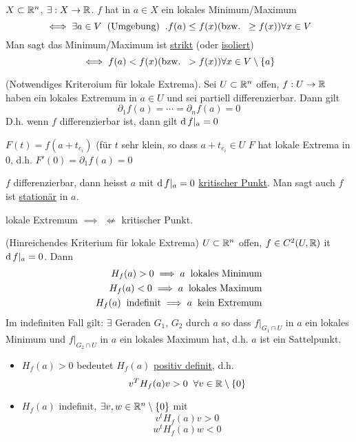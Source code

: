 \begin{Def}
  $X\subset \mathbb{R}^n$, $\exists:X\rightarrow \mathbb{R}$. $f$ hat in $a\in X$ ein lokales Minimum/Maximum 
  \[\iff\exists a\in V\hspace{2mm}\text{(Umgebung)}\hspace{2mm}. f(a)\leq f(x) (\text{bzw.}\hspace{2mm} \geq f(x)) \forall x\in V\]
  Man sagt das Minimum/Maximum ist \ul{strikt} (oder \ul{isoliert})
  \[\iff f(a)<f(x)(\text{bzw.}\hspace{2mm}>f(x))\forall x\in V\setminus \left\{ a \right\}\]
\end{Def}
\begin{Sat}
  (Notwendiges Kriteroium für lokale Extrema). Sei $U\subset\mathbb{R}^n$ offen, $f:U\rightarrow\mathbb{R}$ haben ein lokales Extremum in $a\in U$ und sei partiell differenzierbar. Dann gilt
  \[\partial_1f(a)=\cdots=\partial_nf(a)=0\]
  D.h. wenn $f$ differenzierbar ist, dann gilt $\operatorname{d} f|_a=0$
\end{Sat}
\begin{Bew}
  $F(t)=f(a+t_{e_i})$ (für $t$ sehr klein, so dass $a+t_{e_i}\in U$ $F$ hat lokale Extrema in 0, d.h. $F'(0)=\partial_1 f(a)=0$
\end{Bew}
\begin{Def}
  $f$ differenzierbar, dann heisst $a$ mit $\operatorname{d} f|_a=0$ \ul{kritischer Punkt}. Man sagt auch $f$ ist \ul{stationär} in $a$. 
\end{Def}
\begin{Bem}
  lokale Extremum $\implies$ $\not\Leftarrow$ kritischer Punkt.
\end{Bem}
\begin{Sat}
  (Hinreichendes Kriterium für lokale Extrema) $U\subset\mathbb{R}^n$ offen, $f\in C^2(U,\mathbb{R})$ it $\operatorname{d} f|_a=0$. Dann
  \begin{eqnarray*}
    H_f(a)>0\implies a\hspace{2mm}\text{lokales Minimum}\\
    H_f(a)<0\implies a\hspace{2mm}\text{lokales Maximum}\\
    H_f(a)\hspace{2mm}\text{indefinit}\implies a\hspace{2mm}\text{kein Extremum}
  \end{eqnarray*}
  Im indefiniten Fall gilt: $\exists$ Geraden $G_1$, $G_2$ durch $a$ so dass $f|_{G_1\cap U}$ in $a$ ein lokales Minimum und $f|_{G_2\cap U}$ in $a$ ein lokales Maximum hat, d.h. $a$ ist ein Sattelpunkt.
\end{Sat}
\begin{Bem}
  \begin{itemize}
    \item 
      $H_f(a)>0$ bedeutet $H_f(a)$ \ul{positiv definit}, d.h. 
      \[v^TH_f(a)v>0\hspace{2mm}\forall v\in\mathbb{R}\setminus\left\{ 0 \right\}\]
    \item
      $H_f(a)$ indefinit, $\exists v,w\in\mathbb{R}^n\setminus\left\{ 0 \right\}$ mit
      \[v^tH_f(a)v>0\]
      \[w^tH_f(a)w<0\]
  \end{itemize}
\end{Bem}
